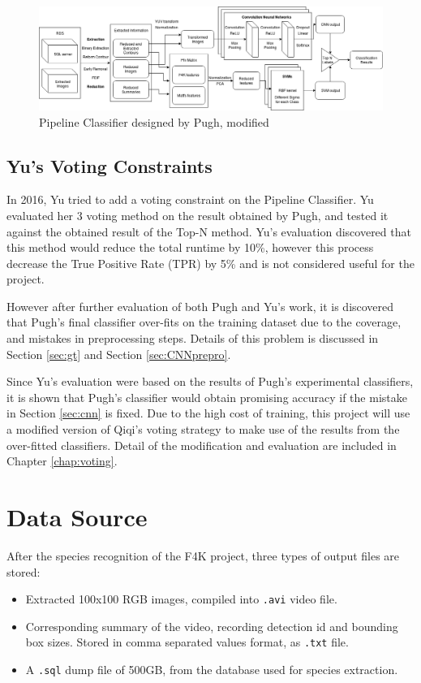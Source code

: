 \documentclass[bsc,logo,twoside,fullspacing,parskip]{infthesis}
\begin{document}
\begin{figure}[!h]
    \centering
    \includegraphics[scale=0.3]{graph/Pipeline_Classifier.png}
    \caption{Pipeline Classifier designed by Pugh, modified}
    \label{fig:pipeline}
\end{figure}

\section{Yu's Voting Constraints}

In 2016, Yu\cite{Yu} tried to add a voting constraint on the Pipeline Classifier. 
Yu evaluated her 3 voting method on the result obtained by Pugh, and tested it against the obtained result of the Top-N method. 
Yu's evaluation discovered that this method would reduce the total runtime by 10\%, however this process decrease the True Positive Rate (TPR) by 5\% and is not considered useful for the project. 

However after further evaluation of both Pugh and Yu's work, it is discovered that Pugh's final classifier over-fits on the training dataset due to the coverage, and mistakes in preprocessing steps. Details of this problem is discussed in Section \ref{sec:gt} and Section \ref{sec:CNNprepro}. 

Since Yu's evaluation were based on the results of Pugh's experimental classifiers, it is shown that Pugh's classifier would obtain promising accuracy if the mistake in Section \ref{sec:cnn} is fixed. Due to the high cost of training, this project will use a modified version of Qiqi's voting strategy to make use of the results from the over-fitted classifiers. Detail of the modification and evaluation are included in Chapter \ref{chap:voting}.

\chapter{Data Source}
\label{chap:datasource}

After the species recognition of the F4K project, three types of output files are stored:
\begin{itemize}
\item
Extracted 100x100 RGB images, compiled into {\tt .avi} video file.
\item
Corresponding summary of the video, recording detection id and bounding box sizes. Stored in comma separated values format, as {\tt .txt} file.
\item
A {\tt .sql} dump file of 500GB, from the database used for species extraction.
\end{itemize}
\end{document}
